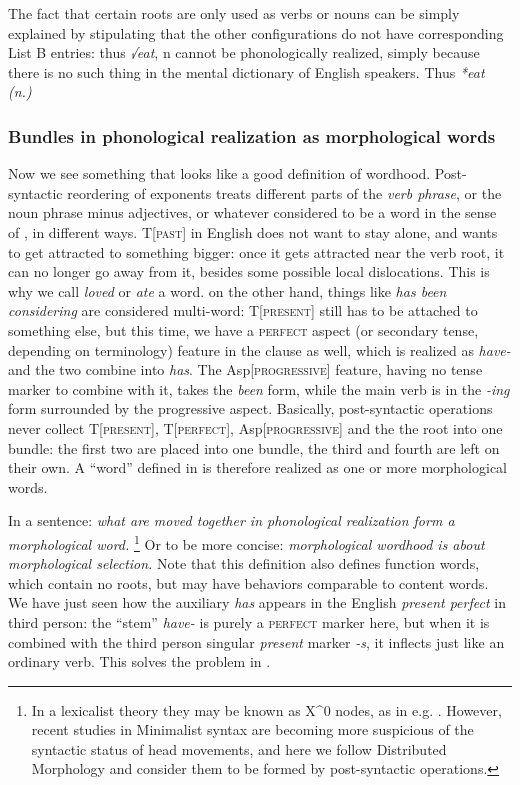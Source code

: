 \documentclass[a4paper, oneside, scheme=plain, 12pt]{article}
\newcommand*{\term}[1]{\emph{#1}}
\newcommand{\form}[1]{\emph{#1}}
\newcommand*{\category}[1]{\textsc{#1}}
\begin{document}
The fact that certain roots are only used as verbs or nouns
can be simply explained by stipulating that the other configurations do not have corresponding List B entries:
thus \form{√eat}, n cannot be phonologically realized,
simply because there is no such thing in the mental dictionary of English speakers.
Thus \form{*eat (n.)}

\subsubsection{Bundles in phonological realization as morphological words}\label{sec:morphological-wordhood-production}

Now we see something that looks like a good definition of wordhood.
Post-syntactic reordering of exponents treats different parts of the \term{verb phrase},
or the noun phrase minus adjectives, or whatever considered to be a word in the sense of , in different ways.
T[\category{past}] in English does not want to stay alone,
and wants to get attracted to something bigger:
once it gets attracted near the verb root,
it can no longer go away from it, besides some possible local dislocations.
This is why we call \form{loved} or \form{ate} a word.
on the other hand, things like \form{has been considering} are considered multi-word:
T[\category{present}] still has to be attached to something else,
but this time, we have a \category{perfect} aspect (or secondary tense, depending on terminology) feature in the clause as well,
which is realized as \form{have-} and the two combine into \form{has}.
The Asp[\category{progressive}] feature, having no tense marker to combine with it,
takes the \form{been} form, while the main verb is in the \form{-ing} form surrounded by the progressive aspect.
Basically, post-syntactic operations never collect T[\category{present}], T[\category{perfect}], Asp[\category{progressive}] and the the root into one bundle:
the first two are placed into one bundle, the third and fourth are left on their own.
A ``word'' defined in 
is therefore realized as one or more morphological words.

In a sentence: \form{what are moved together in phonological realization form a morphological word.}%
\footnote{
    In a lexicalist theory they may be known as X^0 nodes, as in e.g. \citet{bickel2007free}.
    However, recent studies in Minimalist syntax are becoming more suspicious
    of the syntactic status of head movements,
    and here we follow Distributed Morphology and consider them to be formed by 
    post-syntactic operations.
}
Or to be more concise: \form{morphological wordhood is about morphological selection.}
Note that this definition also defines function words,
which contain no roots, but may have behaviors comparable to content words.
We have just seen how the auxiliary \form{has} appears in the English \form{present perfect} in third person:
the ``stem'' \form{have-} is purely a \category{perfect} marker here,
but when it is combined with the third person singular \form{present} marker \form{-s},
it inflects just like an ordinary verb.
This solves the problem in .
\end{document}
